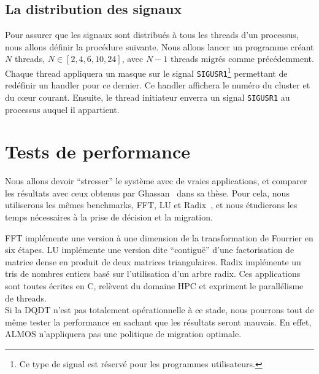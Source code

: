     \subsection{La distribution des signaux}

      Pour assurer que les signaux sont distribués à tous les threads d'un
      processus, nous allons définir la procédure suivante. Nous allons lancer
      un programme créant $N$ threads, $N \in [2, 4, 6, 10, 24]$, avec $N-1$
      threads migrés comme précédemment. Chaque thread appliquera un masque sur
      le signal \texttt{SIGUSR1}\footnote{Ce type de signal est réservé pour les
        programmes utilisateurs.} permettant de redéfinir un handler pour ce
      dernier. Ce handler affichera le numéro du cluster et du c\oe ur
      courant. Ensuite, le thread initiateur enverra un signal \texttt{SIGUSR1}
      au processus auquel il appartient.


  \section{Tests de performance}
  \label{sec:dqdt-test}

    Nous allons devoir ``stresser'' le système avec de vraies applications, et
    comparer les résultats avec ceux obtenus par
    Ghassan~\citeauthor{almaless2014universite} dans sa thèse. Pour cela, nous
    utiliserons les mêmes benchmarks, FFT, LU et Radix~\citep{bailey1989ffts,
      woo1994performance, blelloch1991comparison}, et nous étudierons les temps
    nécessaires à la prise de décision et la migration.

    FFT implémente une version à une dimension de la transformation de Fourrier
    en six étapes. LU implémente une version dite ``contiguë'' d’une
    factorisation de matrice dense en produit de deux matrices
    triangulaires. Radix implémente un tris de nombres entiers basé sur
    l’utilisation d’un arbre radix. Ces applications sont toutes écrites en C,
    relèvent du domaine HPC et expriment le parallélisme de threads.\\

    Si la DQDT n'est pas totalement opérationnelle à ce stade, nous pourrons
    tout de même tester la performance en sachant que les résultats seront
    mauvais. En effet, ALMOS n'appliquera pas une politique de migration
    optimale.

